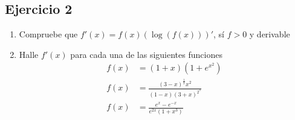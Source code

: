 \documentclass[a4paper]{article}
\begin{document}
\subsection{Ejercicio 2}
\noindent
\begin{enumerate}
    \item Compruebe que \(f'(x) = f(x)\left(\log{\left(f(x)\right)}\right)'\), sí \(f > 0\)
    y derivable
    \item Halle \(f'(x)\) para cada una de las siguientes funciones
    \begin{align*}
        f(x) &= \left(1 + x\right)\left(1 + e^{x^2}\right) \\
        f(x) &= \frac{(3 - x)^{\frac{1}{3}}x^2}{(1 - x)(3 + x)^{2^{3}}} \\
        f(x) &= \frac{e^{x} - e^{-x}}{e^{2x}(1 + x^3)}
    \end{align*}
\end{enumerate}
\end{document}
